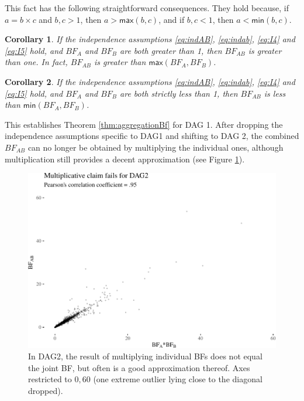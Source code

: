 \documentclass[
  10pt,
  dvipsnames,enabledeprecatedfontcommands]{scrartcl}
\newtheorem{corollary}{Corollary}[fact]
\begin{document}
This fact has the following straightforward consequences. They hold
because, if \(a = b \times c\) and \(b, c>1\), then
\(a > \mathsf{max}(b,c)\), and if \(b, c<1\), then
\(a < \mathsf{min}(b,c)\).

\begin{corollary} If the independence assumptions \eqref{eq:indAB}, \eqref{eq:indab}, \eqref{eq:I4} and \eqref{eq:I5} hold, and $BF_{A}$ and $BF_{B}$ are both greater than 1, then $BF_{AB}$ is greater than one. In fact,  $BF_{AB}$ is  greater than  $\mathsf{max}(BF_{A},BF_{B})$. \label{cor:BFind2}
\end{corollary}

\begin{corollary} If the independence assumptions \eqref{eq:indAB}, \eqref{eq:indab}, \eqref{eq:I4} and \eqref{eq:I5} hold, and $BF_{A}$ and $BF_{B}$ are both strictly less than 1, then $BF_{AB}$  is less than  $\mathsf{min}(BF_{A}, BF_{B})$. \label{cor:BFind3}
\end{corollary}

This establishes Theorem \ref{thm:aggregationBf} for \textsf{DAG 1}.
After dropping the independence assumptions specific to \textsf{DAG1}
and shifting to \textsf{DAG 2}, the combined \(BF_{AB}\) can no longer
be obtained by multiplying the individual ones, although multiplication
still provides a decent approximation (see Figure \ref{fig:BFmulti}).

\begin{figure}[H]

\begin{center}\includegraphics[width=0.75\linewidth]{conjunction-appendix14_files/figure-latex/unnamed-chunk-12-1} \end{center}
\caption{In DAG2, the result of multiplying individual BFs does not equal the joint BF, but often is a good approximation thereof. Axes restricted to $0,60$ (one extreme outlier lying close to the diagonal dropped).}
\label{fig:BFmulti}
\end{figure}
\end{document}
